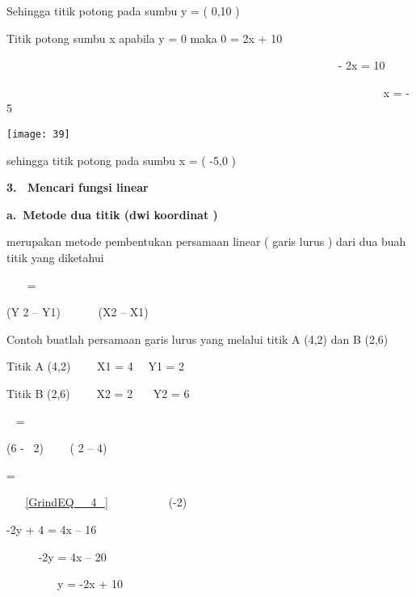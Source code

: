 \documentclass[11pt,fleqn]{book} %
\begin{document}
\noindent 

\noindent Sehingga titik potong pada sumbu y = ( 0,10 )

\noindent 

\noindent Titik potong sumbu x apabila y = 0 maka 0 = 2x + 10

\noindent 

\noindent ~~~~~~~~~~~~~~~~~~~~~~~~~~~~~~~~~~~~~~~~~~~~~~~~~~~~~~~~~    ~- 2x = 10

\noindent ~~~~~~~~~~~~~~~~~~~~~~~~~~~~~~~~~~~~~~~~~~~~~~~~~~~~~~~~~~~~~~~~~~         x = - 5~

\noindent 

\begin{center}
\noindent \texttt{[image: 39]}
\end{center}

\noindent sehingga titik potong pada sumbu x = ( -5,0 )

\noindent 

\noindent 

\noindent \textbf{3. ~Mencari fungsi linear}

\noindent \textbf{}

\noindent \textbf{a.~Metode dua titik (dwi koordinat )}

merupakan metode pembentukan persamaan linear ( garis lurus ) dari dua buah titik yang diketahui

\noindent {}~~~ =~~

\noindent (Y 2 -- Y1)~~~~~ ~(X2 -- X1)

\noindent 

\noindent Contoh buatlah persamaan garis lurus yang melalui titik A (4,2) dan B (2,6)

\noindent 

\noindent Titik A (4,2)~~~~ X1 = 4~~ Y1 = 2

\noindent Titik B (2,6)~~~~ X2 = 2~~~ Y2 = 6

\noindent {}~ =~~

\noindent (6 -~ 2)~~~~ ( 2 -- 4) ~ ~ ~ ~ ~

\noindent {}=~~

\noindent ~ ~ \eqref{GrindEQ__4_}~~~~~~~~~~ (-2)

\noindent -2y + 4 = 4x -- 16

\noindent ~~~~~ -2y = 4x -- 20

\noindent ~~~~~~~~~y = -2x + 10
\end{document}
